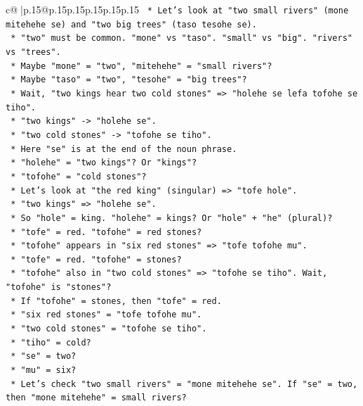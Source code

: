 \documentclass{article}
\begin{document}
{\begin{supertabular}{c@{$\;$}|p{.15\linewidth}@{}p{.15\linewidth}p{.15\linewidth}p{.15\linewidth}p{.15\linewidth}p{.15\linewidth}}
{{{\texttt{        *   Let's look at "two small rivers" (mone mitehehe se) and "two big trees" (taso tesohe se).} \\
\texttt{        *   "two" must be common. "mone" vs "taso". "small" vs "big". "rivers" vs "trees".} \\
\texttt{        *   Maybe "mone" = "two", "mitehehe" = "small rivers"?} \\
\texttt{        *   Maybe "taso" = "two", "tesohe" = "big trees"?} \\
\texttt{        *   Wait, "two kings hear two cold stones" => "holehe se lefa tofohe se tiho".} \\
\texttt{            *   "two kings" {-}> "holehe se".} \\
\texttt{            *   "two cold stones" {-}> "tofohe se tiho".} \\
\texttt{            *   Here "se" is at the end of the noun phrase.} \\
\texttt{            *   "holehe" = "two kings"? Or "kings"?} \\
\texttt{            *   "tofohe" = "cold stones"?} \\
\texttt{        *   Let's look at "the red king" (singular) => "tofe hole".} \\
\texttt{        *   "two kings" => "holehe se".} \\
\texttt{        *   So "hole" = king. "holehe" = kings? Or "hole" + "he" (plural)?} \\
\texttt{        *   "tofe" = red. "tofohe" = red stones?} \\
\texttt{        *   "tofohe" appears in "six red stones" => "tofe tofohe mu".} \\
\texttt{        *   "tofe" = red. "tofohe" = stones?} \\
\texttt{        *   "tofohe" also in "two cold stones" => "tofohe se tiho". Wait, "tofohe" is "stones"?} \\
\texttt{        *   If "tofohe" = stones, then "tofe" = red.} \\
\texttt{        *   "six red stones" = "tofe tofohe mu".} \\
\texttt{        *   "two cold stones" = "tofohe se tiho".} \\
\texttt{        *   "tiho" = cold?} \\
\texttt{        *   "se" = two?} \\
\texttt{        *   "mu" = six?} \\
\texttt{        *   Let's check "two small rivers" = "mone mitehehe se". If "se" = two, then "mone mitehehe" = small rivers?} \\
}}}
\end{supertabular}}
\end{document}
